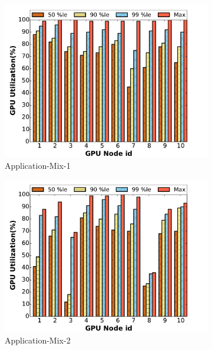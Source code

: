 \begin{figure}[!tbp]
\begin{subfigure}[b]{0.33\textwidth}
  \centering
  \includegraphics[width=1.1\linewidth]{results/app1-peak.pdf}
  \caption{Application-Mix-1}
  \label{fig:app1-pcp}
\end{subfigure}
\begin{subfigure}[b]{.33\textwidth}
  \centering
  \includegraphics[width=1.1\linewidth]{results/app2-peak.pdf}
  \caption{Application-Mix-2}
  \label{fig:app2-pcp}
\end{subfigure}
\begin{subfigure}[b]{.33\textwidth}
  \centering

\end{subfigure}
\end{figure}
